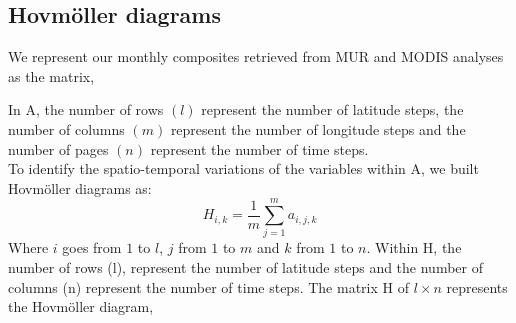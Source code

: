 \documentclass{article} %
\begin{document}

\subsection{Hovmöller diagrams}

We represent our monthly composites retrieved from MUR and MODIS analyses as the matrix, 

\begin{center}
\end{center}


In A, the number of rows $(l)$ represent the number of latitude steps, the number of columns $(m)$ represent the number of longitude steps and the number of pages $(n)$ represent the number of time steps.\\

To identify the spatio-temporal variations of the variables within A, we built Hovmöller diagrams as:\\

\begin{equation*}
H_{i,k}=\frac{1}{m} \sum_{j=1}^{m} a_{i,j,k} 
\end{equation*}
Where $i$ goes from $1$ to $l$, $j$ from $1$ to $m$ and $k$ from $1$ to $n$. Within H, the number of rows (l), represent the number of latitude steps and the number of columns (n) represent the number of time steps. The matrix H of $l\times n$ represents the Hovmöller diagram,
 
\end{document}
